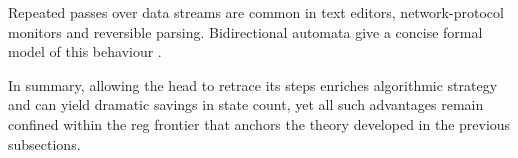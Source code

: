 \begin{observation}\label{obs:two-way-app}
Repeated passes over data streams are common in text editors,
network-protocol monitors and reversible parsing.
Bidirectional automata give a concise formal model of this behaviour
\cite{shepherdson1959reduction}.
\end{observation}

In summary, allowing the head to retrace its steps enriches algorithmic
strategy and can yield dramatic savings in state count,
yet all such advantages remain confined within the \gls{reg}
frontier that anchors the theory developed in the previous subsections.
